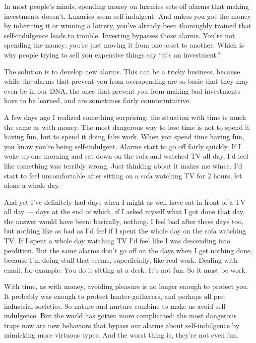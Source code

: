 \documentclass[12pt]{book}
\begin{document}
In most people's minds, spending money on luxuries sets off alarms that
making investments doesn't. Luxuries seem self-indulgent. And unless you
got the money by inheriting it or winning a lottery, you've already been
thoroughly trained that self-indulgence leads to trouble. Investing
bypasses those alarms. You're not spending the money; you're just moving
it from one asset to another. Which is why people trying to sell you
expensive things say ``it's an investment.''

The solution is to develop new alarms. This can be a tricky business,
because while the alarms that prevent you from overspending are so basic
that they may even be in our DNA, the ones that prevent you from making
bad investments have to be learned, and are sometimes fairly
counterintuitive.

A few days ago I realized something surprising: the situation with time
is much the same as with money. The most dangerous way to lose time is
not to spend it having fun, but to spend it doing fake work. When you
spend time having fun, you know you're being self-indulgent. Alarms
start to go off fairly quickly. If I woke up one morning and sat down on
the sofa and watched TV all day, I'd feel like something was terribly
wrong. Just thinking about it makes me wince. I'd start to feel
uncomfortable after sitting on a sofa watching TV for 2 hours, let alone
a whole day.

And yet I've definitely had days when I might as well have sat in front
of a TV all day --- days at the end of which, if I asked myself what I
got done that day, the answer would have been: basically, nothing. I
feel bad after these days too, but nothing like as bad as I'd feel if I
spent the whole day on the sofa watching TV. If I spent a whole day
watching TV I'd feel like I was descending into perdition. But the same
alarms don't go off on the days when I get nothing done, because I'm
doing stuff that seems, superficially, like real work. Dealing with
email, for example. You do it sitting at a desk. It's not fun. So it
must be work.

With time, as with money, avoiding pleasure is no longer enough to
protect you. It probably was enough to protect hunter-gatherers, and
perhaps all pre-industrial societies. So nature and nurture combine to
make us avoid self-indulgence. But the world has gotten more
complicated: the most dangerous traps now are new behaviors that bypass
our alarms about self-indulgence by mimicking more virtuous types. And
the worst thing is, they're not even fun.
\end{document}
